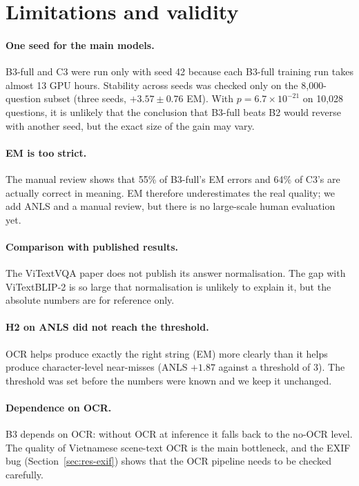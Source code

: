 \section{Limitations and validity}
\label{sec:dis-validity}

\paragraph{One seed for the main models.} B3-full and C3 were run only with seed 42 because
each B3-full training run takes almost 13 GPU hours. Stability across seeds was checked only
on the 8,000-question subset (three seeds, $+3.57 \pm 0.76$ EM). With $p = 6.7\times10^{-21}$
on 10,028 questions, it is unlikely that the conclusion that B3-full beats B2 would reverse
with another seed, but the exact size of the gain may vary.

\paragraph{EM is too strict.} The manual review shows that 55\% of B3-full's EM errors and
64\% of C3's are actually correct in meaning. EM therefore underestimates the real quality;
we add ANLS and a manual review, but there is no large-scale human evaluation yet.

\paragraph{Comparison with published results.} The ViTextVQA paper does not publish its
answer normalisation. The gap with ViTextBLIP-2 is so large that normalisation is unlikely
to explain it, but the absolute numbers are for reference only.

\paragraph{H2 on ANLS did not reach the threshold.} OCR helps produce exactly the right
string (EM) more clearly than it helps produce character-level near-misses (ANLS $+1.87$
against a threshold of 3). The threshold was set before the numbers were known and we
keep it unchanged.

\paragraph{Dependence on OCR.} B3 depends on OCR: without OCR at inference it falls back to
the no-OCR level. The quality of Vietnamese scene-text OCR is the main bottleneck, and the
EXIF bug (Section~\ref{sec:res-exif}) shows that the OCR pipeline needs to be checked
carefully.

